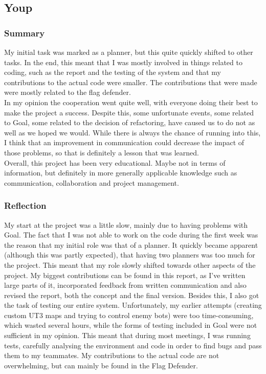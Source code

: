 \subsection{Youp}
\subsubsection{Summary}
My initial task was marked as a planner, but this quite quickly shifted to other tasks. In the end, this meant that I was mostly involved in things related to coding, such as the report and the testing of the system and that my contributions to the actual code were smaller. The contributions that were made were mostly related to the flag defender.\\

In my opinion the cooperation went quite well, with everyone doing their best to make the project a success. Despite this, some unfortunate events, some related to Goal, some related to the decision of refactoring, have caused us to do not as well as we hoped we would. While there is always the chance of running into this, I think that an improvement in communication could decrease the impact of those problems, so that is definitely a lesson that was learned.\\

Overall, this project has been very educational. Maybe not in terms of information, but definitely in more generally applicable knowledge such as communication, collaboration and project management. 

\subsubsection{Reflection}
My start at the project was a little slow, mainly due to having problems with Goal. The fact that I was not able to work on the code during the first week was the reason that my initial role was that of a planner. It quickly became apparent (although this was partly expected), that having two planners was too much for the project. This meant that my role slowly shifted towards other aspects of the project. My biggest contributions can be found in this report, as I've written large parts of it, incorporated feedback from written communication and also revised the report, both the concept and the final version. Besides this, I also got the task of testing our entire system. Unfortunately, my earlier attempts (creating custom UT3 maps and trying to control enemy bots) were too time-consuming, which wasted several hours, while the forms of testing included in Goal were not sufficient in my opinion. This meant that during most meetings, I was running tests, carefully analysing the environment and code in order to find bugs and pass them to my teammates. My contributions to the actual code are not overwhelming, but can mainly be found in the Flag Defender.\\

